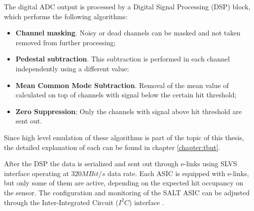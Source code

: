 The digital ADC output is processed by a Digital Signal Processing (DSP) block, which performs the following algorithms: 

\begin{itemize}
    \item \textbf{Channel masking}. Noisy or dead channels can be masked and not taken removed from further processing; 
    \item \textbf{Pedestal subtraction}. This subtraction is performed in each channel independently using a different value;
    \item \textbf{Mean Common Mode Subtraction}. Removal of the mean value of calculated on top of channels with signal below the certain hit threshold; 
    \item \textbf{Zero Suppression}; Only the channels with signal above hit threshold are sent out.
\end{itemize}

Since high level emulation of these algorithms is part of the topic of this thesis, the detailed explanation of each can be found in chapter \ref{chapter:tbut}. 

After the DSP the data is serialized and sent out through e-links using SLVS interface \cite{SLVS} operating at $320 MBit/s$ data rate. Each ASIC is equipped with  e-links, but only some of them are active, depending on the expected hit occupancy on the sensor.  The configuration and monitoring of the SALT ASIC can be adjusted through the Inter-Integrated
Circuit ($I^{2}C$) interface \cite{i2c}.  

